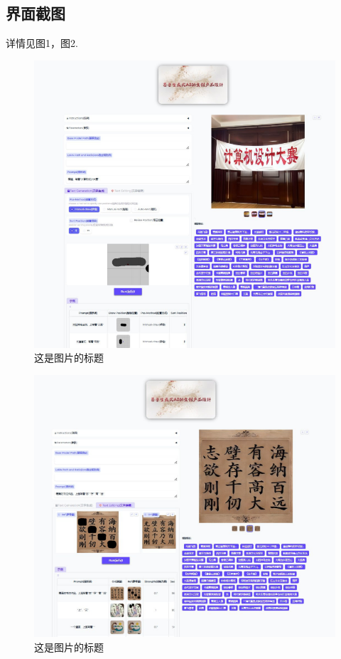 \documentclass[a4paper,12pt]{ctexart}  %
\begin{document}
\subsection{界面截图}
详情见图1，图2.
\begin{figure}[htbp] %
    \centering %
    \includegraphics[width=1\textwidth]{Image/UI_1.png} %
    \caption{这是图片的标题} %
    \label{fig:logo} %
\end{figure}
\begin{figure}[htbp] %
    \centering %
    \includegraphics[width=1\textwidth]{Image/UI_2.png} %
    \caption{这是图片的标题} %
    \label{fig:logo} %
\end{figure}
\end{document}
